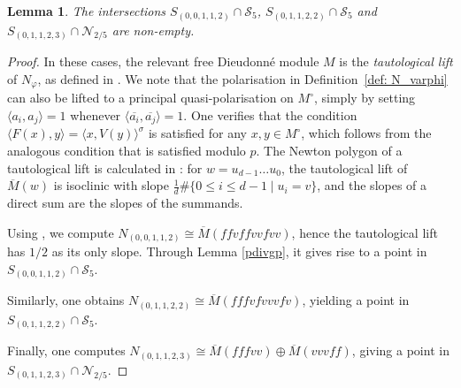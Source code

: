\documentclass[11pt,table]{amsart}
\numberwithin{equation}{section}
\newtheorem{lem}[thm]{Lemma}
\theoremstyle{definition}
\theoremstyle{remark}
\theoremstyle{remark}
\begin{document}
\begin{lem} \label{lem: tautological}
The intersections $S_{(0,0,1,1,2)} \cap \mathcal{S}_5$, $S_{(0,1,1,2,2)} \cap \mathcal{S}_5$ and $S_{(0,1,1,2,3)} \cap \mathcal{N}_{2/5}$ are non-empty.
\end{lem}
\begin{proof}
In these cases, the relevant free Dieudonn\'{e} module $M$ is the \emph{tautological lift} of $N_\varphi$, as defined in \cite[(2.5)]{OortSimple}. We note that the polarisation in Definition~\ref{def: N_varphi} can also be lifted to a principal quasi-polarisation on $M^\circ$, simply by setting $\langle a_i, a_j\rangle = 1$ whenever $\langle \overline{a_i}, \overline{a_j} \rangle = 1$. One verifies that the condition $\langle F(x), y \rangle = \langle x,V(y) \rangle^\sigma$ is satisfied for any $x,y\in M^\circ$, which follows from the analogous condition that is satisfied modulo $p$. The Newton polygon of a tautological lift is calculated in \cite[(2.6)]{OortSimple}: for $w=u_{d-1} \ldots u_0$, the tautological lift of $\overline{M}(w)$ is isoclinic with slope $\frac{1}{d}\#\{0 \leq i \leq d-1 \; | \; u_i=v\}$, and the slopes of a direct sum are the slopes of the summands.

Using \cite[(9.1)]{oort2001stratification}, we compute $N_{(0,0,1,1,2)} \cong \overline{M}(ffvffvvfvv)$, hence the tautological lift has $1/2$ as its only slope. Through Lemma \ref{pdivgp}, it gives rise to a point in $S_{(0,0,1,1,2)} \cap \mathcal{S}_5$.

Similarly, one obtains $N_{(0,1,1,2,2)} \cong \overline{M}(fffvfvvvfv)$, yielding a point in $S_{(0,1,1,2,2)} \cap \mathcal{S}_5$.

Finally, one computes $N_{(0,1,1,2,3)} \cong \overline{M}(fffvv) \oplus \overline{M}(vvvff)$, giving a point in $S_{(0,1,1,2,3)} \cap \mathcal{N}_{2/5}$.
\end{proof}
\end{document}
